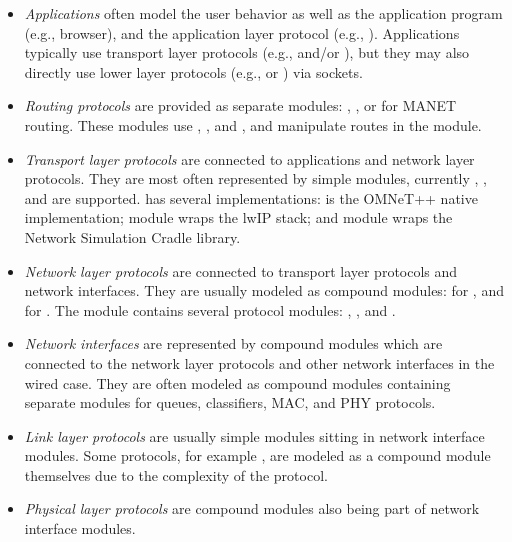 \begin{itemize}
  \item \textit{Applications} often model the user behavior as well as the
     application program (e.g., browser), and the application layer protocol
     (e.g., ). Applications typically use transport layer
     protocols (e.g.,  and/or ), but they may
     also directly use lower layer protocols (e.g.,  or
     ) via sockets.
  \item \textit{Routing protocols} are provided as separate modules:
     , , or  for MANET routing.
     These modules use , , and ,
     and manipulate routes in the  module.
  \item \textit{Transport layer protocols} are connected to applications and
     network layer protocols. They are most often represented by simple
     modules, currently , , and 
     are supported.  has several implementations: 
     is the OMNeT++ native implementation;  module wraps the
     lwIP  stack; and  module wraps the
     Network Simulation Cradle library.
  \item \textit{Network layer protocols} are connected to transport layer
     protocols and network interfaces. They are usually modeled as compound
     modules:  for , and
      for . The 
     module contains several protocol modules: , ,
     and .
  \item \textit{Network interfaces} are represented by compound modules
     which are connected to the network layer protocols and other network
     interfaces in the wired case. They are often modeled as compound modules
     containing separate modules for queues, classifiers, MAC, and PHY protocols.
  \item \textit{Link layer protocols} are usually simple modules sitting
     in network interface modules. Some protocols, for example
     , are modeled as a compound module themselves
     due to the complexity of the protocol.
  \item \textit{Physical layer protocols} are compound modules also being part
     of network interface modules.

\end{itemize}
